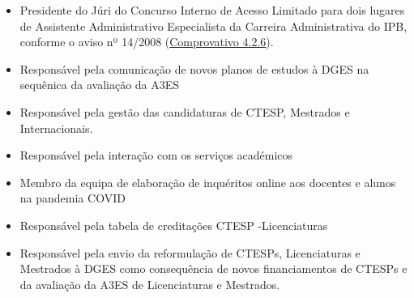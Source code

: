 \documentclass[11pt]{article}
\begin{document}
\begin{itemize}
\item {Presidente do Júri do Concurso Interno de Acesso Limitado para dois lugares de Assistente Administrativo Especialista da Carreira Administrativa do IPB, conforme o aviso nº 14/2008 (\href{run:MissaoIPBoutros/AssAdmin.pdf}{Comprovativo 4.2.6}).}
\item {Responsável pela comunicação de novos planos de estudos à DGES na sequênica da avaliação da A3ES}
\item {Responsável pela gestão das candidaturas de CTESP, Mestrados e Internacionais.}
\item {Responsável pela interação com os serviços académicos}
\item {Membro da equipa de elaboração de inquéritos online aos docentes e alunos na pandemia COVID}
\item {Responsável pela tabela de creditações CTESP -Licenciaturas}
\item {Responsável pela envio da reformulação de CTESPs, Licenciaturas e Mestrados à DGES como consequência de novos financiamentos de CTESPs e da avaliação da A3ES de Licenciaturas e Mestrados.}

\end{itemize}
\end{document}
